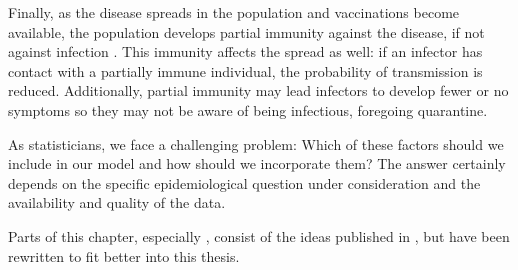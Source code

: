 Finally, as the disease spreads in the population and vaccinations become available, the population develops partial immunity against the disease, if not against infection \citep{Wu2023Longterm}. This immunity affects the spread as well: if an infector has contact with a partially immune individual, the probability of transmission is reduced. Additionally, partial immunity may lead infectors to develop fewer or no symptoms so they may not be aware of being infectious, foregoing quarantine.

As statisticians, we face a challenging problem: Which of these factors should we include in our model and how should we incorporate them? The answer certainly depends on the specific epidemiological question under consideration and the availability and quality of the data. 

Parts of this chapter, especially , consist of the ideas published in \citep{Heyder2023Measures}, but have been rewritten to fit better into this thesis.


%
%
%
%